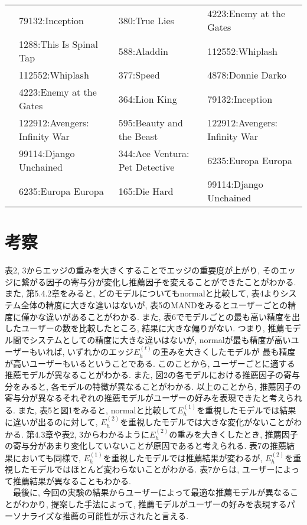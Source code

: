 \documentclass[a4j,11pt]{jarticle}           %
\begin{document}
\begin{table}[htbp]
{\begin{tabular}{llll}
				&79132:Inception &380:True Lies &4223:Enemy at the Gates \\
				&1288:This Is Spinal Tap &588:Aladdin  &112552:Whiplash \\
				&112552:Whiplash &377:Speed &4878:Donnie Darko \\
				&4223:Enemy at the Gates &364:Lion King &79132:Inception \\
				&122912:Avengers: Infinity War &595:Beauty and the Beast &122912:Avengers: Infinity War \\
				&99114:Django Unchained &344:Ace Ventura: Pet Detective &6235:Europa Europa \\
				&6235:Europa Europa &165:Die Hard &99114:Django Unchained \\ \hline
			\end{tabular}
		}
		
	\end{table}
	\newpage
	\section{考察}
	表2, 3からエッジの重みを大きくすることでエッジの重要度が上がり, そのエッジに繋がる因子の寄与分が変化し推薦因子を変えることができたことがわかる.また, 第5.4.2章をみると, どのモデルについてもnormalと比較して, 表4よりシステム全体の精度に大きな違いはないが, 表5のMANDをみるとユーザーごとの精度に僅かな違いがあることがわかる. また, 表6でモデルごとの最も高い精度を出したユーザーの数を比較したところ, 結果に大きな偏りがない. 
	つまり, 推薦モデル間でシステムとしての精度に大きな違いはないが, normalが最も精度が高いユーザーもいれば, いずれかのエッジ$E_h^{(t)}$の重みを大きくしたモデルが
	最も精度が高いユーザーもいるということである. このことから, ユーザーごとに適する推薦モデルが異なることがわかる. 
	また, 図2の各モデルにおける推薦因子の寄与分をみると, 各モデルの特徴が異なることがわかる. 
	以上のことから, 推薦因子の寄与分が異なるそれぞれの推薦モデルがユーザーの好みを表現できたと考えられる. 
	また, 表5と図1をみると, normalと比較して$E_h^{(1)}$を重視したモデルでは結果に違いが出るのに対して, $E_h^{(2)}$を重視したモデルでは大きな変化がないことがわかる. 第4.3章や表2, 3からわかるように$E_h^{(2)}$の重みを大きくしたとき, 推薦因子の寄与分があまり変化していないことが原因であると考えられる. 
	表7の推薦結果においても同様で, $E_h^{(1)}$を重視したモデルでは推薦結果が変わるが, $E_h^{(2)}$を重視したモデルではほとんど変わらないことがわかる. 
	表7からは, ユーザーによって推薦結果が異なることもわかる. 
	\\　最後に, 今回の実験の結果からユーザーによって最適な推薦モデルが異なることがわかり, 
	提案した手法によって, 推薦モデルがユーザーの好みを表現するパーソナライズな推薦の可能性が示されたと言える.  
	\newpage
\end{document}
